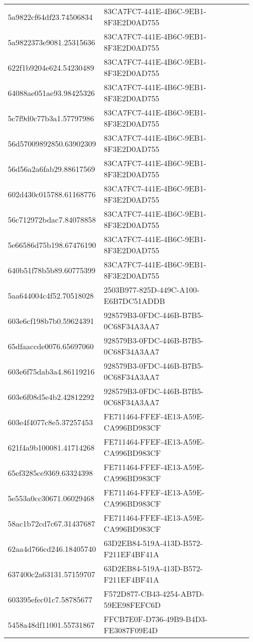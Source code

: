 \begin{tabular}{ll}
5a9822cf64df23.74506834 & 83CA7FC7-441E-4B6C-9EB1-8F3E2D0AD755 \\
5a9822373e9081.25315636 & 83CA7FC7-441E-4B6C-9EB1-8F3E2D0AD755 \\
622f1b9204e624.54230489 & 83CA7FC7-441E-4B6C-9EB1-8F3E2D0AD755 \\
64088ae051ae93.98425326 & 83CA7FC7-441E-4B6C-9EB1-8F3E2D0AD755 \\
5c7f9d0c77b3a1.57797986 & 83CA7FC7-441E-4B6C-9EB1-8F3E2D0AD755 \\
56d57009892850.63902309 & 83CA7FC7-441E-4B6C-9EB1-8F3E2D0AD755 \\
56d56a2a6fab29.88617569 & 83CA7FC7-441E-4B6C-9EB1-8F3E2D0AD755 \\
602d430c015788.61168776 & 83CA7FC7-441E-4B6C-9EB1-8F3E2D0AD755 \\
56c712972bdac7.84078858 & 83CA7FC7-441E-4B6C-9EB1-8F3E2D0AD755 \\
5e66586d75b198.67476190 & 83CA7FC7-441E-4B6C-9EB1-8F3E2D0AD755 \\
640b51f78b5b89.60775399 & 83CA7FC7-441E-4B6C-9EB1-8F3E2D0AD755 \\
5aa644004c4f52.70518028 & 2503B977-825D-449C-A100-E6B7DC51ADDB \\
603e6cf198b7b0.59624391 & 928579B3-0FDC-446B-B7B5-0C68F34A3AA7 \\
65dfaaccde0076.65697060 & 928579B3-0FDC-446B-B7B5-0C68F34A3AA7 \\
603e6f75dab3a4.86119216 & 928579B3-0FDC-446B-B7B5-0C68F34A3AA7 \\
603e6f08d5e4b2.42812292 & 928579B3-0FDC-446B-B7B5-0C68F34A3AA7 \\
603e4f4077c8e5.37257453 & FE711464-FFEF-4E13-A59E-CA996BD983CF \\
621f4a9b100081.41714268 & FE711464-FFEF-4E13-A59E-CA996BD983CF \\
65ef3285ce9369.63324398 & FE711464-FFEF-4E13-A59E-CA996BD983CF \\
5e553a0cc30671.06029468 & FE711464-FFEF-4E13-A59E-CA996BD983CF \\
58ac1b72cd7c67.31437687 & FE711464-FFEF-4E13-A59E-CA996BD983CF \\
62aa4d766cd246.18405740 & 63D2EB84-519A-413D-B572-F211EF4BF41A \\
637400c2a63131.57159707 & 63D2EB84-519A-413D-B572-F211EF4BF41A \\
603395efec01c7.58785677 & F572D877-CB43-4254-AB7D-59EE98FEFC6D \\
5458a48df11001.55731867 & FFCB7E0F-D736-49B9-B4D3-FE3087F09E4D \\

\end{tabular}
